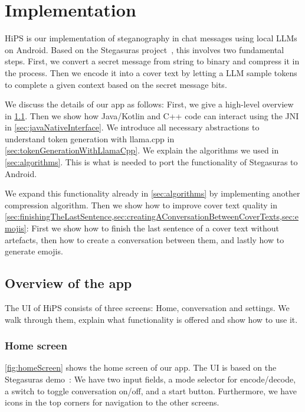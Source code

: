 
\chapter{Implementation}\label{ch:implementation}
\glsresetall %

\gls{HiPS} is our implementation of steganography in chat messages using local \glspl{LLM} on Android. Based on the Stegasuras project~\cite{zieglerNeuralLinguisticSteganography2019}, this involves two fundamental steps. First, we convert a secret message from string to binary and compress it in the process. Then we encode it into a cover text by letting a \gls{LLM} sample tokens to complete a given context based on the secret message bits.

We discuss the details of our app as follows: First, we give a high-level overview in \cref{sec:overviewOfTheApp}. Then we show how Java/Kotlin and C++ code can interact using the \gls{JNI} in \cref{sec:javaNativeInterface}. We introduce all necessary abstractions to understand token generation with llama.cpp in \cref{sec:tokenGenerationWithLlamaCpp}. We explain the algorithms we used in \cref{sec:algorithms}. This is what is needed to port the functionality of Stegasuras to Android.

We expand this functionality already in \cref{sec:algorithms} by implementing another compression algorithm. Then we show how to improve cover text quality in \cref{sec:finishingTheLastSentence,sec:creatingAConversationBetweenCoverTexts,sec:emojis}: First we show how to finish the last sentence of a cover text without artefacts, then how to create a conversation between them, and lastly how to generate emojis.

\section{Overview of the app}
\label{sec:overviewOfTheApp}
The \gls{UI} of \gls{HiPS} consists of three screens: Home, conversation and settings. We walk through them, explain what functionality is offered and show how to use it.

\subsection{Home screen}
\label{sec:homeScreen}
\cref{fig:homeScreen} shows the home screen of our app. The \gls{UI} is based on the Stegasuras demo~\cite{zieglerStegasuras2025}: We have two input fields, a mode selector for encode/decode, a switch to toggle conversation on/off, and a start button. Furthermore, we have icons in the top corners for navigation to the other screens.

